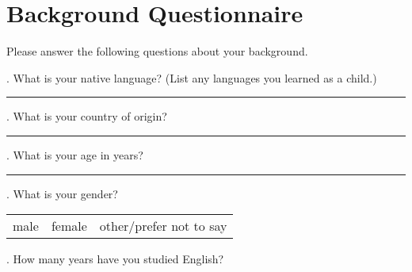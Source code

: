 \label{questionnaire}

\section{Background Questionnaire}
Please answer the following questions about your background.

\bigskip
\bigskip

. What is your native language? (List any languages you learned as a child.)

\smallskip 

\rule{14cm}{0.4pt}

\bigskip

. What is your country of origin?

\smallskip 

\rule{14cm}{0.4pt}

\bigskip


. What is your age in years?

\smallskip 

\rule{14cm}{0.4pt}

\bigskip


. What is your gender?

\smallskip

\begin{table}[htb!]
\begin{tabular}{ccc}
\hspace{2em} male & \hspace{1em} female & \hspace{1em} other/prefer not to say
\end{tabular}
\end{table}

\smallskip

. How many years have you studied English?

\smallskip

